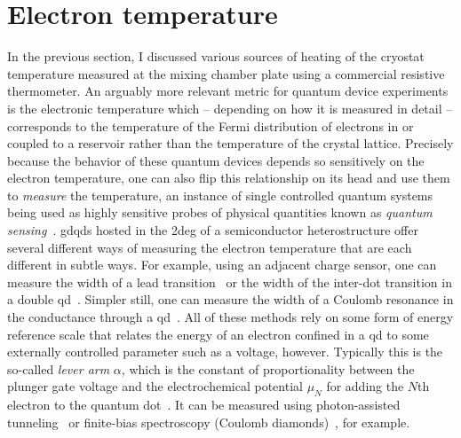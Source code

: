 \section{Electron temperature}\label{sec:setup:cooling:etemp}
In the previous section, I discussed various sources of heating of the cryostat temperature measured at the mixing chamber plate using a commercial resistive thermometer.
An arguably more relevant metric for quantum device experiments is the electronic temperature which -- depending on how it is measured in detail -- corresponds to the temperature of the Fermi distribution of electrons in or coupled to a reservoir rather than the temperature of the crystal lattice.
Precisely because the behavior of these quantum devices depends so sensitively on the electron temperature, one can also flip this relationship on its head and use them to \emph{measure} the temperature, an instance of single controlled quantum systems being used as highly sensitive probes of physical quantities known as \emph{quantum sensing}~\cite{Degen2017}.
\Glspl{gdqd} hosted in the \gls{2deg} of a semiconductor heterostructure offer several different ways of measuring the electron temperature that are each different in subtle ways.
For example, using an adjacent charge sensor, one can measure the width of a lead
transition~\cite{Maradan2014} or the width of the inter-dot transition in a double \gls{qd}~\cite{DiCarlo2004}.
Simpler still, one can measure the width of a Coulomb resonance in the conductance through a \gls{qd}~\cite{Ihn2009,Maradan2014}.
All of these methods rely on some form of energy reference scale that relates the energy of an electron confined in a \gls{qd} to some externally controlled parameter such as a voltage, however.
Typically this is the so-called \emph{lever arm} $\alpha$, which is the constant of proportionality between the plunger gate voltage and the electrochemical potential $\mu_N$ for adding the $N$th electron to the quantum dot~\cite{Ihn2009}.
It can be measured using photon-assisted tunneling~\cite{Kouwenhoven1994} or finite-bias spectroscopy (Coulomb diamonds)~\cite{Kouwenhoven2001,Ihn2009}, for example.

